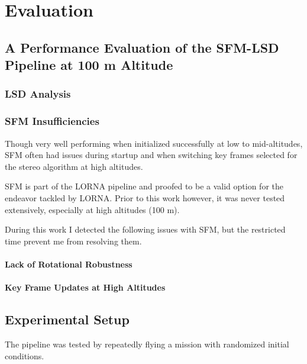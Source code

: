 \chapter{Evaluation}
\label{chapter:evaluation}

\section{A Performance Evaluation of the SFM-LSD Pipeline at 100 m Altitude}\label{sec:sfm_lsd_eval}
\subsection{LSD Analysis}
\subsection{SFM Insufficiencies}\label{subsec:sfm_insufficiencies}

Though very well performing when initialized successfully at low to mid-altitudes, SFM often had issues during startup and when switching key frames selected for the stereo algorithm at high altitudes.

SFM is part of the LORNA pipeline and proofed to be a valid option for the endeavor tackled by LORNA. Prior to this work however, it was never tested extensively, especially at high altitudes (100 m).

During this work I detected the following issues with SFM, but the restricted time prevent me from resolving them.

\subsubsection{Lack of Rotational Robustness}
\subsubsection{Key Frame Updates at High Altitudes}
\section{Experimental Setup}

The pipeline was tested by repeatedly flying a mission with randomized initial conditions.

